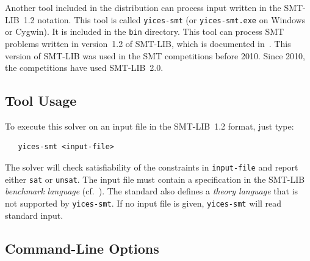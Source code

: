 \documentclass[11pt,twoside,fleqn,openright,titlepage]{cslreport}
\begin{document}
Another tool included in the distribution can process input written in
the SMT-LIB~1.2 notation. This tool is called \texttt{yices-smt} (or
\texttt{yices-smt.exe} on Windows or Cygwin). It is included in the
\texttt{bin} directory.  This tool can process SMT problems written in
version~1.2 of SMT-LIB, which is documented
in~\cite{SMTLIB12:2006}. This version of SMT-LIB was used in the SMT
competitions before 2010.  Since 2010, the competitions have used
SMT-LIB~2.0.


\subsection{Tool Usage}

To execute this solver on an input file in the SMT-LIB~1.2 format, just type:
\begin{small}
\begin{verbatim}
   yices-smt <input-file>
\end{verbatim}
\end{small}
The solver will check satisfiability of the constraints in
\texttt{input-file} and report either \texttt{sat} or
\texttt{unsat}. The input file must contain a specification in the
SMT-LIB {\em benchmark language\/} (cf.~\cite{SMTLIB12:2006}). The
standard also defines a {\em theory language\/} that is not supported
by \texttt{yices-smt}. If no input file is given, \texttt{yices-smt}
will read standard input.


\subsection{Command-Line Options}
\end{document}
